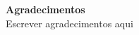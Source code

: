 \thispagestyle{empty}
\begin{center}
\end{center}

\begin{flushright}\footnotesize
\vspace{17cm}

\textbf{Agradecimentos} \\

Escrever agradecimentos aqui
\end{flushright}
